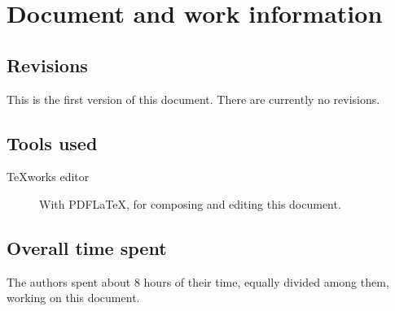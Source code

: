 \chapter{Document and work information}

\section{Revisions}
This is the first version of this document. There are currently no revisions.

\section{Tools used}
\begin{description}
\item[TeXworks editor] With PDF\LaTeX{}, for composing and editing this document.
\end{description}

\section{Overall time spent}
The authors spent about 8 hours of their time, equally divided among them, working on this document.
